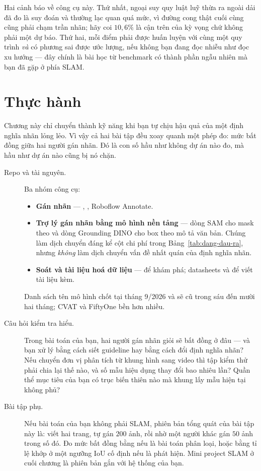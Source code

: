 \documentclass[../../deep_learning.tex]{subfiles}
\begin{document}
Hai cảnh báo về công cụ này. Thứ nhất, ngoại suy quy luật luỹ thừa ra ngoài dải đã đo là suy đoán và thường lạc quan quá mức, vì đường cong thật cuối cùng cũng phải chạm trần nhãn; hãy coi \(10{,}6\%\) là cận trên của kỳ vọng chứ không phải một dự báo. Thứ hai, mỗi điểm phải được huấn luyện với cùng một quy trình \emph{và} có phương sai được ước lượng, nếu không bạn đang đọc nhiễu như đọc xu hướng --- đây chính là bài học từ benchmark có thành phần ngẫu nhiên mà bạn đã gặp ở phía SLAM.

\section{Thực hành}
Chương này chỉ chuyển thành kỹ năng khi bạn tự chịu hậu quả của một định nghĩa nhãn lỏng lẻo. Vì vậy cả hai bài tập đều xoay quanh một phép đo: mức bất đồng giữa hai người gán nhãn. Đó là con số hầu như không dự án nào đo, mà hầu như dự án nào cũng bị nó chặn.

\begin{description}
\item[Repo và tài nguyên.] Ba nhóm công cụ:
  \begin{itemize}
  \item \textbf{Gán nhãn} --- , , Roboflow Annotate.
  \item \textbf{Trợ lý gán nhãn bằng mô hình nền tảng} --- dòng SAM cho mask theo  \cite{kirillov2023sam} và dòng Grounding DINO cho box theo mô tả văn bản. Chúng làm dịch chuyển đáng kể cột chi phí trong Bảng~\ref{tab:dang-dau-ra}, nhưng \emph{không} làm dịch chuyển vấn đề nhất quán của định nghĩa nhãn.
  \item \textbf{Soát và tài liệu hoá dữ liệu} ---  để khám phá; datasheets \cite{gebru2021datasheets} và  \cite{mitchell2019model} để viết tài liệu kèm.
  \end{itemize}
  Danh sách tên mô hình chốt tại tháng 9/2026 và sẽ cũ trong sáu đến mười hai tháng; CVAT và FiftyOne bền hơn nhiều.
\item[Câu hỏi kiểm tra hiểu.] Trong bài toán của bạn, hai người gán nhãn giỏi sẽ bất đồng ở đâu --- và bạn xử lý bằng cách siết guideline hay bằng cách đổi định nghĩa nhãn? Nếu chuyển đơn vị phân tích từ khung hình sang video thì tập kiểm thử phải chia lại thế nào, và số mẫu hiệu dụng thay đổi bao nhiêu lần? Quần thể mục tiêu của bạn có trục biến thiên nào mà khung lấy mẫu hiện tại không phủ?
\item[Bài tập phụ.] Nếu bài toán của bạn không phải SLAM, phiên bản tổng quát của bài tập này là: viết  hai trang, tự gán \(200\) ảnh, rồi nhờ một người khác gán \(50\) ảnh trong số đó. Đo mức bất đồng bằng  \cite{cohen1960kappa} nếu là bài toán phân loại, hoặc bằng tỉ lệ khớp ở một ngưỡng IoU cố định nếu là phát hiện. Mini project SLAM ở cuối chương là phiên bản gắn với hệ thống của bạn.
\end{description}
\end{document}
